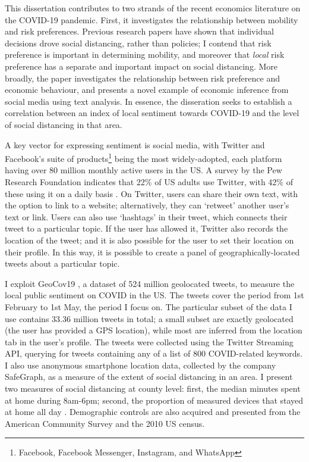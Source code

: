 \documentclass{article}
\begin{document}
This dissertation contributes to two strands of the recent economics literature on the COVID-19 pandemic. First, it investigates the relationship between mobility and risk preferences. Previous research papers have shown that individual decisions drove social distancing, rather than policies; I contend that risk preference is important in determining mobility, and moreover that \textit{local} risk preference has a separate and important impact on social distancing. More broadly, the paper investigates the relationship between risk preference and economic behaviour, and presents a novel example of economic inference from social media using text analysis. In essence, the disseration seeks to establish a correlation between an index of local sentiment towards COVID-19 and the level of social distancing in that area.

A key vector for expressing sentiment is social media, with Twitter and Facebook's suite of products\footnote{Facebook, Facebook Messenger, Instagram, and WhatsApp} being the most widely-adopted, each platform having over 80 million monthly active users in the US. A survey by the Pew Research Foundation indicates that 22\% of US adults use Twitter, with 42\% of these using it on a daily basis \parencite{perrinShareAdultsUsing2019}. On Twitter, users can share their own text, with the option to link to a website; alternatively, they can `retweet' another user's text or link. Users can also use `hashtags' in their tweet, which connects their tweet to a particular topic. If the user has allowed it, Twitter also records the location of the tweet; and it is also possible for the user to set their location on their profile. In this way, it is possible to create a panel of geographically-located tweets about a particular topic. 

I exploit GeoCov19 \parencite{qaziGeoCoV19DatasetHundreds2020a}, a dataset of 524 million geolocated tweets, to measure the local public sentiment on COVID in the US. The tweets cover the period from 1st February to 1st May, the period I focus on. The particular subset of the data I use contains 33.36 million tweets in total; a small subset are exactly geolocated (the user has provided a GPS location), while most are inferred from the location tab in the user's profile. The tweets were collected using the Twitter Streaming API, querying for tweets containing any of a list of 800 COVID-related keywords. I also use anonymous smartphone location data, collected by the company SafeGraph, as a measure of the extent of social distancing in an area. I present two measures of social distancing at county level: first, the median minutes spent at home during 8am-6pm; second, the proportion of measured devices that stayed at home all day \parencite{safegraphinc.SocialDistancingMetrics2020}. Demographic controls are also acquired and presented from the American Community Survey and the 2010 US census. 
\end{document}
